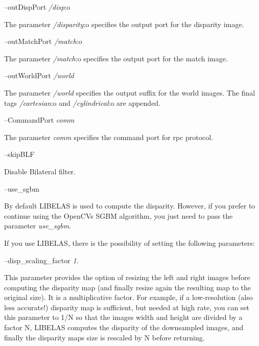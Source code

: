 --out\+Disp\+Port {\itshape /disp}\+:o
\begin{DoxyItemize}
\item The parameter {\itshape /disparity}\+:o specifies the output port for the disparity image.
\end{DoxyItemize}

--out\+Match\+Port {\itshape /match}\+:o
\begin{DoxyItemize}
\item The parameter {\itshape /match}\+:o specifies the output port for the match image.
\end{DoxyItemize}

--out\+World\+Port {\itshape /world} 
\begin{DoxyItemize}
\item The parameter {\itshape /world} specifies the output suffix for the world images. The final tags {\itshape /cartesian}\+:o and {\itshape /cylindrical}\+:o are appended.
\end{DoxyItemize}

--Command\+Port {\itshape comm} 
\begin{DoxyItemize}
\item The parameter {\itshape comm} specifies the command port for rpc protocol.
\end{DoxyItemize}

--skip\+B\+LF
\begin{DoxyItemize}
\item Disable Bilateral filter.
\end{DoxyItemize}

--use\+\_\+sgbm
\begin{DoxyItemize}
\item By default L\+I\+B\+E\+L\+AS is used to compute the disparity. However, if you prefer to continue using the Open\+CV\textquotesingle{}s S\+G\+BM algorithm, you just need to pass the parameter {\itshape use\+\_\+sgbm}.
\end{DoxyItemize}

If you use L\+I\+B\+E\+L\+AS, there is the possibility of setting the following parameters\+:

--disp\+\_\+scaling\+\_\+factor {\itshape 1.} 
\begin{DoxyItemize}
\item This parameter provides the option of resizing the left and right images before computing the disparity map (and finally resize again the resulting map to the original size). It is a multiplicative factor. For example, if a low-\/resolution (also less accurate!) disparity map is sufficient, but needed at high rate, you can set this parameter to 1/N so that the images width and height are divided by a factor N, L\+I\+B\+E\+L\+AS computes the disparity of the downsampled images, and finally the disparity map\textquotesingle{}s size is rescaled by N before returning.
\end{DoxyItemize}

